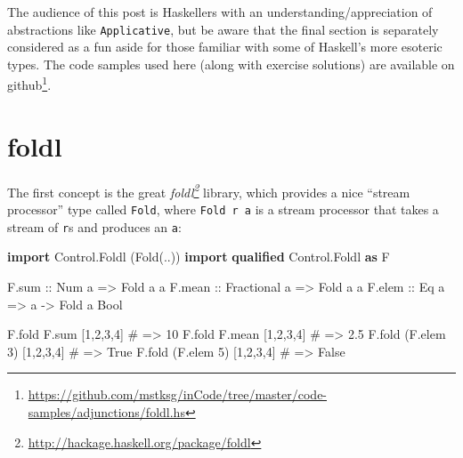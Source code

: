 \documentclass[]{article}
\newenvironment{Shaded}{}{}
\newcommand{\DataTypeTok}[1]{\textcolor[rgb]{0.56,0.13,0.00}{#1}}
\newcommand{\DecValTok}[1]{\textcolor[rgb]{0.25,0.63,0.44}{#1}}
\newcommand{\KeywordTok}[1]{\textcolor[rgb]{0.00,0.44,0.13}{\textbf{#1}}}
\newcommand{\NormalTok}[1]{#1}
\newcommand{\OtherTok}[1]{\textcolor[rgb]{0.00,0.44,0.13}{#1}}
\newcommand{\PreprocessorTok}[1]{\textcolor[rgb]{0.74,0.48,0.00}{#1}}
\renewcommand{\href}[2]{#2\footnote{\url{#1}}}
\begin{document}
The audience of this post is Haskellers with an understanding/appreciation of
abstractions like \texttt{Applicative}, but be aware that the final section is
separately considered as a fun aside for those familiar with some of Haskell's
more esoteric types. The code samples used here (along with exercise solutions)
are
\href{https://github.com/mstksg/inCode/tree/master/code-samples/adjunctions/foldl.hs}{available
on github}.

\section{foldl}\label{foldl}

The first concept is the great
\emph{\href{http://hackage.haskell.org/package/foldl}{foldl}} library, which
provides a nice ``stream processor'' type called \texttt{Fold}, where
\texttt{Fold\ r\ a} is a stream processor that takes a stream of \texttt{r}s and
produces an \texttt{a}:

\begin{Shaded}
\begin{Highlighting}[]
\KeywordTok{import}           \DataTypeTok{Control.Foldl}\NormalTok{   (}\DataTypeTok{Fold}\NormalTok{(..))}
\KeywordTok{import} \KeywordTok{qualified} \DataTypeTok{Control.Foldl}   \KeywordTok{as} \DataTypeTok{F}

\NormalTok{F.sum}\OtherTok{  ::} \DataTypeTok{Num}\NormalTok{ a        }\OtherTok{=\textgreater{}} \DataTypeTok{Fold}\NormalTok{ a a}
\NormalTok{F.mean}\OtherTok{ ::} \DataTypeTok{Fractional}\NormalTok{ a }\OtherTok{=\textgreater{}} \DataTypeTok{Fold}\NormalTok{ a a}
\NormalTok{F.elem}\OtherTok{ ::} \DataTypeTok{Eq}\NormalTok{ a         }\OtherTok{=\textgreater{}}\NormalTok{ a }\OtherTok{{-}\textgreater{}} \DataTypeTok{Fold}\NormalTok{ a }\DataTypeTok{Bool}

\NormalTok{F.fold F.sum  [}\DecValTok{1}\NormalTok{,}\DecValTok{2}\NormalTok{,}\DecValTok{3}\NormalTok{,}\DecValTok{4}\NormalTok{]}
\PreprocessorTok{\#   =\textgreater{} 10}
\NormalTok{F.fold F.mean [}\DecValTok{1}\NormalTok{,}\DecValTok{2}\NormalTok{,}\DecValTok{3}\NormalTok{,}\DecValTok{4}\NormalTok{]}
\PreprocessorTok{\#   =\textgreater{} 2.5}
\NormalTok{F.fold (F.elem }\DecValTok{3}\NormalTok{) [}\DecValTok{1}\NormalTok{,}\DecValTok{2}\NormalTok{,}\DecValTok{3}\NormalTok{,}\DecValTok{4}\NormalTok{]}
\PreprocessorTok{\#   =\textgreater{} True}
\NormalTok{F.fold (F.elem }\DecValTok{5}\NormalTok{) [}\DecValTok{1}\NormalTok{,}\DecValTok{2}\NormalTok{,}\DecValTok{3}\NormalTok{,}\DecValTok{4}\NormalTok{]}
\PreprocessorTok{\#   =\textgreater{} False}
\end{Highlighting}
\end{Shaded}
\end{document}
